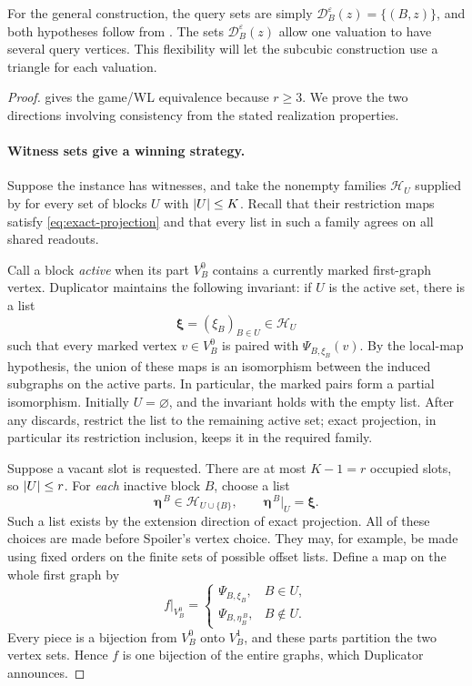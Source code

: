 \documentclass[11pt]{article}
\theoremstyle{definition}
\newcommand{\cH}{\mathcal H}
\newcommand{\eps}{\varepsilon}
\DeclarePairedDelimiter{\abs}{\lvert}{\rvert}
\begin{document}
For the general construction, the query sets are simply
\(\mathcal D_B^\eps(z)=\{(B,z)\}\), and both hypotheses follow from
. The sets \(\mathcal D_B^\eps(z)\)
allow one valuation to have several query vertices. This flexibility
will let the subcubic construction use a triangle for each valuation.

\begin{proof}
 gives the game/WL equivalence because \(r\ge3\).
We prove the two directions involving consistency from the stated
realization properties.

\paragraph{Witness sets give a winning strategy.}
Suppose the instance has witnesses, and take the nonempty families
$\cH_U$ supplied by  for every set of blocks
$U$ with $\abs{U}\leq K$.  Recall that their restriction maps satisfy
\eqref{eq:exact-projection} and that every list in such a family agrees on
all shared readouts.

Call a block \emph{active} when its part $V_B^0$ contains a currently
marked first-graph vertex.  Duplicator maintains the following invariant:
if $U$ is the active set, there is a list
\[
 \boldsymbol\xi=(\xi_B)_{B\in U}\in\cH_U
\]
such that every marked vertex $v\in V_B^0$ is paired with
$\Psi_{B,\xi_B}(v)$.  By the local-map hypothesis, the union of these maps is an isomorphism
between the induced subgraphs on the active parts.  In particular, the marked pairs form a partial isomorphism.
Initially $U=\varnothing$, and the invariant holds with the empty list.
After any discards, restrict the list to the remaining active set; exact
projection, in particular its restriction inclusion, keeps it in the
required family.

Suppose a vacant slot is requested.  There are at most $K-1=r$ occupied
slots, so $\abs{U}\leq r$.  For \emph{each} inactive block $B$, choose a
list
\begin{equation}
\label{uniform:preselected-extension}
 \boldsymbol\eta^{\,B}\in\cH_{U\cup\{B\}},
 \qquad
 \boldsymbol\eta^{\,B}|_U=\boldsymbol\xi.
\end{equation}
Such a list exists by the extension direction of exact projection.
All of these choices are made before Spoiler's vertex choice.  They may,
for example, be made using fixed orders on the finite sets of possible
offset lists.  Define a map on the whole first graph by
\[
 f|_{V_B^0}=
 \begin{cases}
  \Psi_{B,\xi_B},&B\in U,\\
  \Psi_{B,\eta^{\,B}_B},&B\notin U.
 \end{cases}
\]
Every piece is a bijection from $V_B^0$ onto $V_B^1$, and these parts
partition the two vertex sets.  Hence $f$ is one bijection of the entire
graphs, which Duplicator announces.


\end{proof}
\end{document}
